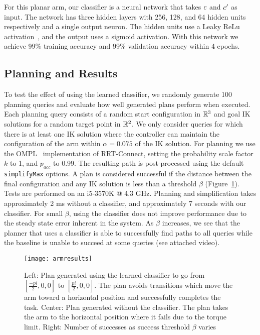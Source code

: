 For this planar arm, our classifier is a neural network that takes $c$ and $c'$ as input. The network has three hidden layers with 256, 128, and 64 hidden units respectively and a single output neuron. The hidden units use a Leaky ReLu activation~\cite{maas2013rectifier}, and the output uses a sigmoid activation. With this network we achieve 99\% training accuracy and 99\% validation accuracy within 4 epochs.


\subsection{Planning and Results} 



To test the effect of using the learned classifier, we randomly generate 100 planning queries and evaluate how well generated plans perform when executed. Each planning query consists of a random start configuration in $\mathbb{R}^3$ and goal IK solutions for a random target point in $\mathbb{R}^2$. We only consider queries for which there is at least one IK solution where the controller can maintain the configuration of the arm within $\alpha = 0.075$ of the IK solution. For planning we use the OMPL~\cite{ompl} implementation of RRT-Connect, setting the probability scale factor $k$ to 1, and $p_{acc}$ to 0.99. The resulting path is post-processed using the default \texttt{simplifyMax} options. A plan is considered successful if the distance between the final configuration and any IK solution is less than a threshold $\beta$ (Figure~\ref{fig:planar_arm}). Tests are performed on an i5-3570K @ 4.3 GHz. Planning and simplification takes approximately 2 ms without a classifier, and approximately 7 seconds with our classifier. For small $\beta$, using the classifier does not improve performance due to the steady state error inherent in the system. As $\beta$ increases, we see that the planner that uses a classifier is able to successfully find paths to all queries while the baseline is unable to succeed at some queries (see attached video).

\begin{figure}[t]
    \vspace{0.02in}
    \centering
    \texttt{[image: armresults]}
    \vspace{-0.1in}
    \caption{Left: Plan generated using the learned classifier to go from $[\frac{-pi}{2}, 0, 0]$ to $[\frac{pi}{2}, 0, 0]$. The plan avoids transitions which move the arm toward a horizontal position and successfully completes the task. Center: Plan generated without the classifier. The plan takes the arm to the horizontal position where it fails due to the torque limit. Right: Number of successes as success threshold $\beta$ varies}
    \label{fig:planar_arm}
\end{figure}



